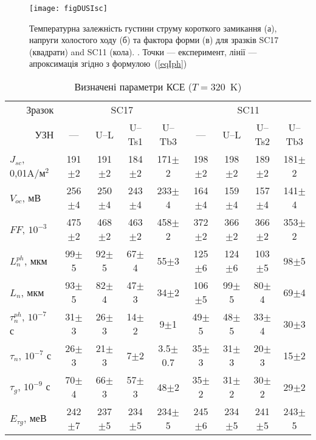 \begin{figure}
\center
\texttt{[image: figDUSIsc]}%
\caption{\label{figDUSIsc}
Температурна залежність густини струму короткого замикання (а),
напруги холостого ходу (б) та
фактора форми (в)
для зразків SC17 (квадрати) and SC11 (кола).
\FigCaptionSSC.
Точки --- експеримент,
лінії --- апроксимація згідно з формулою~(\ref{eqIph})
}%
\end{figure}


\begin{table}
\caption{\label{tabSSCParam}Визначені параметри КСЕ ($T=320$~K)
}
\renewcommand{\tabcolsep}{0.8mm}
\begin{tabular}{|l|c|c|c|c|c|c|c|c|}
\hline
\multicolumn{1}{|r|}{Зразок}&\multicolumn{4}{c|}{SC17}&\multicolumn{4}{c|}{SC11}\\
\cline{1-9}
\multicolumn{1}{|r|}{УЗН}&---&U--L&U--Ts1&U--Tb3&---&U--L&U--Ts2&U--Tb3\\
\hhline{|=========|}
$J_{sc}$, 0,01A/м$^2$&191$\pm$2&191$\pm$2&184$\pm$2&171$\pm$2&198$\pm$2&198$\pm$2&189$\pm$2&181$\pm$2\\ \hline
$V_{oc}$, мВ&256$\pm$4&250$\pm$4&243$\pm$4&233$\pm$4&164$\pm$4&159$\pm$4&157$\pm$4&141$\pm$4\\ \hline
$F\!F$, $10^{-3}$&475$\pm$2&468$\pm$2&463$\pm$2&458$\pm$2&372$\pm$2&366$\pm$2&366$\pm$2&353$\pm$2\\ \hline
$L_n^{ph}$, мкм&99$\pm$5&92$\pm$5&67$\pm$4&55$\pm$3&125$\pm$6&124$\pm$6&103$\pm$5&98$\pm$5\\ \hline
$L_n$, мкм&93$\pm$5&82$\pm$4&47$\pm$3&34$\pm$2&106$\pm$5&99$\pm$5&80$\pm$4&69$\pm$4\\ \hline
$\tau_n^{ph}$, $10^{-7}$ с&31$\pm$3&26$\pm$3&14$\pm$2&9$\pm$1&49$\pm$5&48$\pm$5&33$\pm$4&30$\pm$3\\ \hline
$\tau_n$, $10^{-7}$ с&26$\pm$3&21$\pm$3&7$\pm$2&3.5$\pm$0.7&35$\pm$3&31$\pm$3&20$\pm$3&15$\pm$2\\ \hline
$\tau_g$, $10^{-9}$ с&70$\pm$4&66$\pm$3&57$\pm$3&48$\pm$2&35$\pm$2&31$\pm$2&30$\pm$2&29$\pm$2\\ \hline
$E_{\tau g}$, меВ&242$\pm$7&237$\pm$5&234$\pm$5&234$\pm$5&245$\pm$6&234$\pm$5&241$\pm$5&243$\pm$5\\ \hline

\end{tabular}
\end{table}
